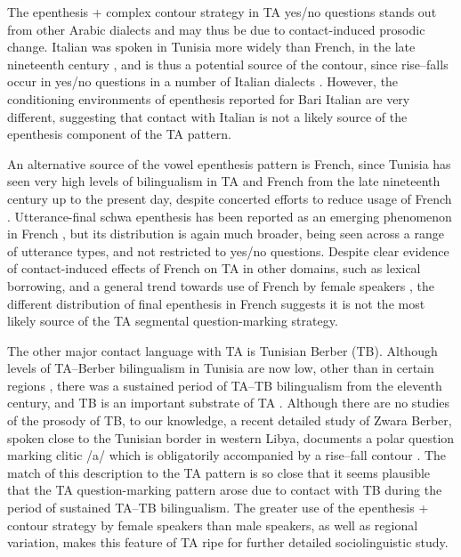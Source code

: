 \documentclass[output=paper]{langsci/langscibook}
\begin{document}
The epenthesis + complex contour strategy in TA yes/no questions stands out from other Arabic dialects and may thus be due to contact-induced prosodic change. Italian was spoken in Tunisia more widely than French, in the late nineteenth century \citep{Sayahi2011}, and is thus a potential source of the contour, since rise--falls occur in yes/no questions in a number of Italian dialects \citep{GiliFivelaEtAl2015}. However, the conditioning environments of epenthesis reported for Bari Italian are very different, suggesting that contact with Italian is not a likely source of the epenthesis component of the TA pattern.

An alternative source of the vowel epenthesis pattern is French, since Tunisia has seen very high levels of bilingualism in TA and French from the late nineteenth century up to the present day, despite concerted efforts to reduce usage of French \citep{Daoud2007}. Utterance-final schwa epenthesis has been reported as an emerging phenomenon in French \citep{Hansen1997}, but its distribution is again much broader, being seen across a range of utterance types, and not restricted to yes/no questions. Despite clear evidence of contact-induced effects of French on TA in other domains, such as lexical borrowing, and a general trend towards use of French by female speakers \citep{Walters2011}, the different distribution of final epenthesis in French suggests it is not the most likely source of the TA segmental question-marking strategy. 

The other major contact language with TA is Tunisian Berber (TB). Although levels of TA--Berber bilingualism in Tunisia are now low, other than in certain regions \citep{Gabsi2011}, there was a sustained period of TA--TB bilingualism from the eleventh century, and TB is an important substrate of TA \citep{Daoud2007}. Although there are no studies of the prosody of TB, to our knowledge, a recent detailed study of Zwara Berber, spoken close to the Tunisian border in western Libya, documents a polar question marking clitic /a/ which is obligatorily accompanied by a rise--fall contour \citep{Gussenhoven2017}. The match of this description to the TA pattern is so close that it seems plausible that the TA question-marking pattern arose due to contact with TB during the period of sustained TA--TB bilingualism. The greater use of the epenthesis + contour strategy by female speakers than male speakers, as well as regional variation, makes this feature of TA ripe for further detailed sociolinguistic study.
\end{document}
